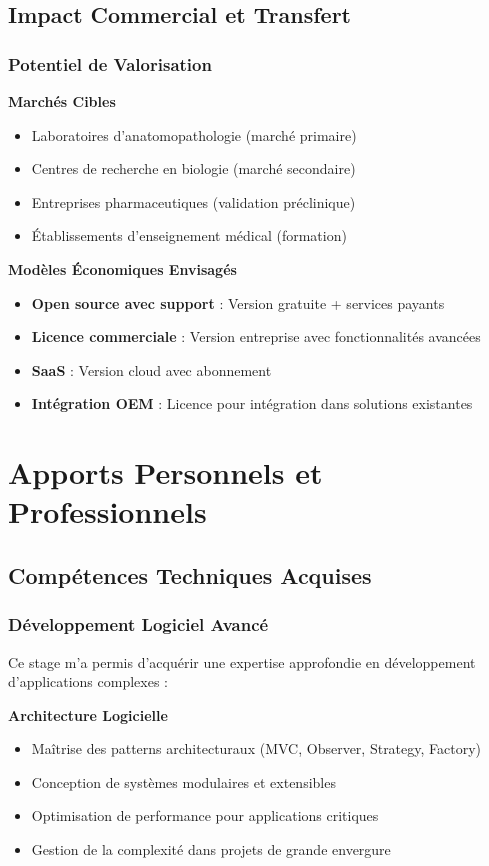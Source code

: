 \documentclass[12pt,a4paper]{report}
\begin{document}
\subsection{Impact Commercial et Transfert}

\subsubsection{Potentiel de Valorisation}

\textbf{Marchés Cibles}
\begin{itemize}
\item Laboratoires d'anatomopathologie (marché primaire)
\item Centres de recherche en biologie (marché secondaire)
\item Entreprises pharmaceutiques (validation préclinique)
\item Établissements d'enseignement médical (formation)
\end{itemize}

\textbf{Modèles Économiques Envisagés}
\begin{itemize}
\item \textbf{Open source avec support} : Version gratuite + services payants
\item \textbf{Licence commerciale} : Version entreprise avec fonctionnalités avancées
\item \textbf{SaaS} : Version cloud avec abonnement
\item \textbf{Intégration OEM} : Licence pour intégration dans solutions existantes
\end{itemize}

\section{Apports Personnels et Professionnels}

\subsection{Compétences Techniques Acquises}

\subsubsection{Développement Logiciel Avancé}

Ce stage m'a permis d'acquérir une expertise approfondie en développement d'applications complexes :

\textbf{Architecture Logicielle}
\begin{itemize}
\item Maîtrise des patterns architecturaux (MVC, Observer, Strategy, Factory)
\item Conception de systèmes modulaires et extensibles
\item Optimisation de performance pour applications critiques
\item Gestion de la complexité dans projets de grande envergure
\end{itemize}
\end{document}
